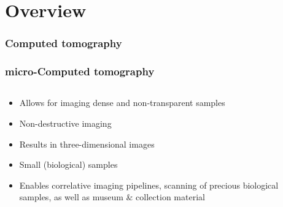 \section{Overview}
\begin{frame}
  \frametitle<1|handout:1>{Computed tomography}
  \frametitle<2-|handout:2>{micro-Computed tomography}
  \begin{columns}%
    \begin{column}{0.62\textwidth}%
      \begin{itemize}%
        \item<1-|handout:1-> Allows for imaging dense and non‐transparent samples
        \item<1-|handout:1-> Non-destructive imaging
        \item<1-|handout:1-> Results in three-dimensional images 
        \item<2-|handout:2> Small (biological) samples%
        \item<2-|handout:2> Enables correlative imaging pipelines, scanning of precious biological samples, as well as museum \& collection material
      \end{itemize}%
    \end{column}%
    \begin{column}{0.38\textwidth}%
      \centering%
\end{column}
\end{columns}
\end{frame}
